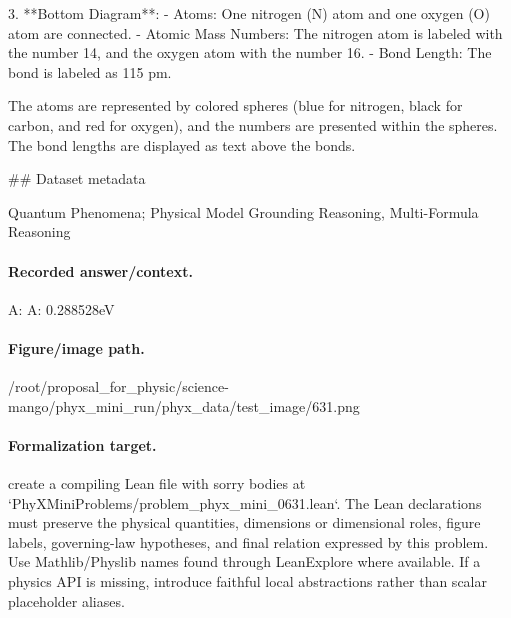 3. **Bottom Diagram**:
   - Atoms: One nitrogen (N) atom and one oxygen (O) atom are connected.
   - Atomic Mass Numbers: The nitrogen atom is labeled with the number 14, and the oxygen atom with the number 16.
   - Bond Length: The bond is labeled as 115 pm.

The atoms are represented by colored spheres (blue for nitrogen, black for carbon, and red for oxygen), and the numbers are presented within the spheres. The bond lengths are displayed as text above the bonds.

\#\# Dataset metadata

Quantum Phenomena; Physical Model Grounding Reasoning, Multi-Formula Reasoning

\paragraph{Recorded answer/context.}
A: A: 0.288528eV

\paragraph{Figure/image path.}
/root/proposal\_for\_physic/science-mango/phyx\_mini\_run/phyx\_data/test\_image/631.png

\paragraph{Formalization target.}
create a compiling Lean file with sorry bodies at `PhyXMiniProblems/problem\_phyx\_mini\_0631.lean`. The Lean declarations must preserve the physical quantities, dimensions or dimensional roles, figure labels, governing-law hypotheses, and final relation expressed by this problem.
Use Mathlib/Physlib names found through LeanExplore where available. If a physics API is missing, introduce faithful local abstractions rather than scalar placeholder aliases.

